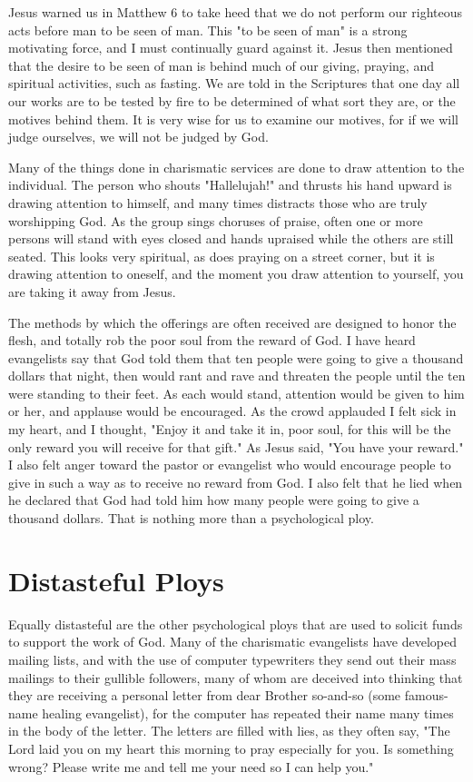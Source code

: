 Jesus warned us in Matthew 6 to take heed that we do not perform our righteous acts before man to be seen of man. This "to be seen of man" is a strong motivating force, and I must continually guard against it. Jesus then mentioned that the desire to be seen of man is behind much of our giving, praying, and spiritual activities, such as fasting. We are told in the Scriptures that one day all our works are to be tested by fire to be determined of what sort they are, or the motives behind them. It is very wise for us to examine our motives, for if we will judge ourselves, we will not be judged by God. 

Many of the things done in charismatic services are done to draw attention to the individual. The person who shouts "Hallelujah!" and thrusts his hand upward is drawing attention to himself, and many times distracts those who are truly worshipping God. As the group sings choruses of praise, often one or more persons will stand with eyes closed and hands upraised while the others are still seated. This looks very spiritual, as does praying on a street corner, but it is drawing attention to oneself, and the moment you draw attention to yourself, you are taking it away from Jesus. 

The methods by which the offerings are often received are designed to honor the flesh, and totally rob the poor soul from the reward of God. I have heard evangelists say that God told them that ten people were going to give a thousand dollars that night, then would rant and rave and threaten the people until the ten were standing to their feet. As each would stand, attention would be given to him or her, and applause would be encouraged. As the crowd applauded I felt sick in my heart, and I thought, "Enjoy it and take it in, poor soul, for this will be the only reward you will receive for that gift." As Jesus said, "You have your reward." I also felt anger toward the pastor or evangelist who would encourage people to give in such a way as to receive no reward from God. I also felt that he lied when he declared that God had told him how many people were going to give a thousand dollars. That is nothing more than a psychological ploy. 

\section*{Distasteful Ploys}

Equally distasteful are the other psychological ploys that are used to solicit funds to support the work of God. Many of the charismatic evangelists have developed mailing lists, and with the use of computer typewriters they send out their mass mailings to their gullible followers, many of whom are deceived into thinking that they are receiving a personal letter from dear Brother so-and-so (some famous-name healing evangelist), for the computer has repeated their name many times in the body of the letter. The letters are filled with lies, as they often say, "The Lord laid you on my heart this morning to pray especially for you. Is something wrong? Please write me and tell me your need so I can help you." 

